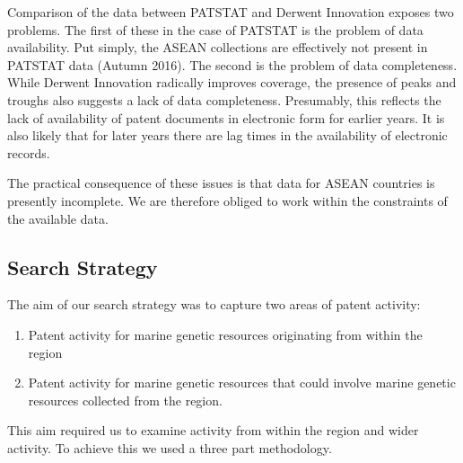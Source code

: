 \documentclass[]{book}
\providecommand{\tightlist}{%
  \setlength{\itemsep}{0pt}\setlength{\parskip}{0pt}}
\theoremstyle{definition}
\theoremstyle{definition}
\theoremstyle{definition}
\theoremstyle{remark}
\begin{document}
Comparison of the data between PATSTAT and Derwent Innovation exposes
two problems. The first of these in the case of PATSTAT is the problem
of data availability. Put simply, the ASEAN collections are effectively
not present in PATSTAT data (Autumn 2016). The second is the problem of
data completeness. While Derwent Innovation radically improves coverage,
the presence of peaks and troughs also suggests a lack of data
completeness. Presumably, this reflects the lack of availability of
patent documents in electronic form for earlier years. It is also likely
that for later years there are lag times in the availability of
electronic records.

The practical consequence of these issues is that data for ASEAN
countries is presently incomplete. We are therefore obliged to work
within the constraints of the available data.

\hypertarget{search-strategy}{%
\subsection{Search Strategy}\label{search-strategy}}

The aim of our search strategy was to capture two areas of patent
activity:

\begin{enumerate}
\def\labelenumi{\arabic{enumi}.}
\tightlist
\item
  Patent activity for marine genetic resources originating from within
  the region
\item
  Patent activity for marine genetic resources that could involve marine
  genetic resources collected from the region.
\end{enumerate}

This aim required us to examine activity from within the region and
wider activity. To achieve this we used a three part methodology.
\end{document}
